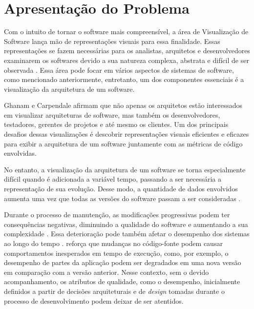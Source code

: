 \section{Apresentação do Problema} \label{sec:apresentacao-do-problema}

Com o intuito de tornar o software mais compreensível, a área de Visualização de Software lança mão de representações visuais para essa finalidade. Essas representações se fazem necessárias para os analistas, arquitetos e desenvolvedores examinarem os softwares devido a sua natureza complexa, abstrata e difícil de ser observada \cite{Petre2006}. Essa área pode focar em vários aspectos de sistemas de software, como mencionado anteriormente, entretanto, um dos componentes essenciais é a visualização da arquitetura de um software.

Ghanam e Carpendale \cite{Ghanam2008} afirmam que não apenas os arquitetos estão interessados em visualizar arquiteturas de software, mas também os desenvolvedores, testadores, gerentes de projetos e até mesmo os clientes. Um dos principais desafios dessas visualizações é descobrir representações visuais eficientes e eficazes para exibir a arquitetura de um software juntamente com as métricas de código envolvidas.

No entanto, a visualização da arquitetura de um software se torna especialmente difícil quando é adicionada a variável tempo, passando a ser necessária a representação de sua evolução. Desse modo, a quantidade de dados envolvidos aumenta uma vez que todas as versões do software passam a ser consideradas \cite{Caserta2011}\cite{Khan2012}.

Durante o processo de manutenção, as modificações progressivas podem ter consequências negativas, diminuindo a qualidade do software e aumentando a sua complexidade \cite{BeladyLaszloA.andLehman1976}\cite{LehmanMeirMandRamilJuanFandWernickPaulDandPerryDewayneEandTurski}. Essa deterioração pode também afetar o desempenho dos sistemas ao longo do tempo \cite{Molyneaux2009}. \citeauthor{SandovalAlcocer2013} reforça que mudanças no código-fonte podem causar comportamentos inesperados em tempo de execução, como, por exemplo, o desempenho de partes da aplicação podem ser degradados em uma nova versão em comparação com a versão anterior. Nesse contexto, sem o devido acompanhamento, os atributos de qualidade, como o desempenho, inicialmente definidos a partir de decisões arquiteturais e de \textit{design} tomadas durante o processo de desenvolvimento podem deixar de ser atentidos.

